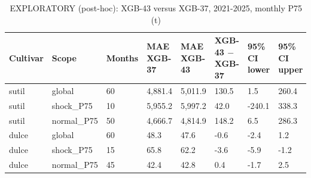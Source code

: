 \begin{table}[H]
\centering
\small
\caption{EXPLORATORY (post-hoc): XGB-43 versus XGB-37, 2021-2025, monthly P75 (t)}
\label{tab:T16_exploratorio_xgb43}
\begin{tabular}{llllllll}
\toprule
Cultivar & Scope & Months & MAE XGB-37 & MAE XGB-43 & XGB-43 $-$ XGB-37 & 95\% CI lower & 95\% CI upper \\
\midrule
sutil & global & 60 & 4,881.4 & 5,011.9 & 130.5 & 1.5 & 260.4 \\
sutil & shock\_P75 & 10 & 5,955.2 & 5,997.2 & 42.0 & -240.1 & 338.3 \\
sutil & normal\_P75 & 50 & 4,666.7 & 4,814.9 & 148.2 & 6.5 & 286.3 \\
dulce & global & 60 & 48.3 & 47.6 & -0.6 & -2.4 & 1.2 \\
dulce & shock\_P75 & 15 & 65.8 & 62.2 & -3.6 & -5.9 & -1.2 \\
dulce & normal\_P75 & 45 & 42.4 & 42.8 & 0.4 & -1.7 & 2.5 \\
\bottomrule
\end{tabular}
\end{table}